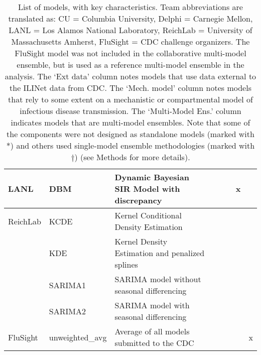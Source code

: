 \begin{table*}
\begin{tabular}{p{1.6cm} l p{7.5cm} l  p{1cm}  p{1cm} p{1cm}}
\hline
LANL     & DBM                & Dynamic Bayesian SIR Model with discrepancy & \cite{osthus2018dynamic} & ~             & x      &              \\ 
\hline
ReichLab & KCDE               & Kernel Conditional Density Estimation & \cite{Ray2017}  & ~             & ~            &        \\ 
~        & KDE                & Kernel Density Estimation and penalized splines & \cite{Ray2018}  & ~             & ~     &               \\ 
~        & SARIMA1            & SARIMA model without seasonal differencing & \cite{Ray2018} & ~             & ~      &              \\ 
~        & SARIMA2            & SARIMA model with seasonal differencing & \cite{Ray2018} & ~             & ~           &         \\ 
\hline
FluSight & unweighted\_avg       & Average of all models submitted to the CDC & \cite{McGowan2018}  &   &  &  x\\
\end{tabular}
\caption{List of models, with key characteristics. Team abbreviations are translated as: CU = Columbia University, Delphi = Carnegie Mellon, LANL = Los Alamos National Laboratory, ReichLab = University of Massachusetts Amherst, FluSight = CDC challenge organizers. The FluSight model was not included in the collaborative multi-model ensemble, but is used as a reference multi-model ensemble in the analysis. The `Ext data' column notes models that use data external to the ILINet data from CDC. The `Mech. model' column notes models that rely to some extent on a mechanistic or compartmental model of infectious disease transmission.\cite{keeling2011modeling} The `Multi-Model Ens.' column indicates models that are multi-model ensembles. Note that some of the components were not designed as standalone models (marked with *) and others used single-model ensemble methodologies (marked with $\dagger$) (see Methods for more details).}
\label{tab:model-list}
\end{table*}